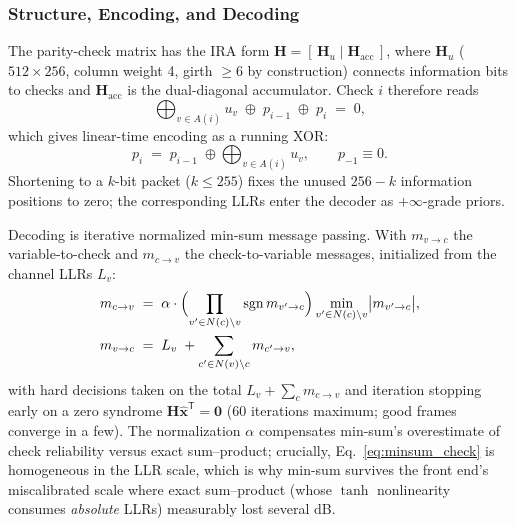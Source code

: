 \subsubsection{Structure, Encoding, and Decoding}

The parity-check matrix has the IRA form
$\mathbf{H} = [\,\mathbf{H}_u \mid \mathbf{H}_{\mathrm{acc}}\,]$,
where $\mathbf{H}_u$ ($512 \times 256$, column weight 4, girth
$\ge 6$ by construction) connects information bits to checks and
$\mathbf{H}_{\mathrm{acc}}$ is the dual-diagonal accumulator.  Check
$i$ therefore reads
\begin{equation}
    \bigoplus_{v \in A(i)} u_v \;\oplus\; p_{i-1} \;\oplus\; p_i
    \;=\; 0,
\end{equation}
which gives linear-time encoding as a running XOR:
\begin{equation}
    p_i \;=\; p_{i-1} \;\oplus \bigoplus_{v \in A(i)} u_v,
    \qquad p_{-1} \equiv 0 .
\end{equation}
Shortening to a $k$-bit packet ($k \le 255$) fixes the unused
$256-k$ information positions to zero; the corresponding LLRs enter
the decoder as $+\infty$-grade priors.

Decoding is iterative normalized min-sum message passing.  With
$m_{v \to c}$ the variable-to-check and $m_{c \to v}$ the
check-to-variable messages, initialized from the channel LLRs $L_v$:
\begin{align}
    m_{c \to v} &\;=\;
        \alpha \cdot
        \Bigl( \prod_{v' \in N(c) \setminus v}
               \operatorname{sgn} m_{v' \to c} \Bigr)
        \min_{v' \in N(c) \setminus v} \bigl| m_{v' \to c} \bigr|,
        \label{eq:minsum_check}\\
    m_{v \to c} &\;=\; L_v \;+ \sum_{c' \in N(v) \setminus c}
        m_{c' \to v},
\end{align}
with hard decisions taken on the total
$L_v + \sum_{c} m_{c \to v}$ and iteration stopping early on a zero
syndrome $\mathbf{H}\hat{\mathbf{x}}^{\mathsf T} = \mathbf{0}$
(60 iterations maximum; good frames converge in a few).  The
normalization $\alpha$ compensates min-sum's overestimate of check
reliability versus exact sum--product; crucially,
Eq.~\eqref{eq:minsum_check} is homogeneous in the LLR scale, which is
why min-sum survives the front end's miscalibrated scale where exact
sum--product (whose $\tanh$ nonlinearity consumes \emph{absolute}
LLRs) measurably lost several dB.

